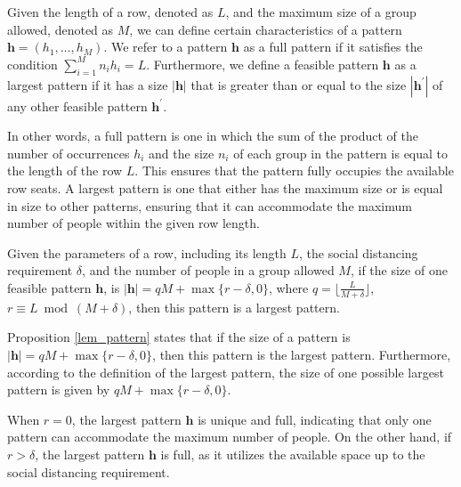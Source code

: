 \begin{definition}
Given the length of a row, denoted as $L$, and the maximum size of a group allowed, denoted as $M$, we can define certain characteristics of a pattern $\bm{h} = (h_1, \ldots, h_M)$.
We refer to a pattern $\bm{h}$ as a full pattern if it satisfies the condition $\sum_{i=1}^{M} n_i h_i = L$. Furthermore, we define a feasible pattern $\bm{h}$ as a largest pattern if it has a size $|\bm{h}|$ that is greater than or equal to the size $|\bm{h}^{\prime}|$ of any other feasible pattern $\bm{h}^{\prime}$.
\end{definition}

In other words, a full pattern is one in which the sum of the product of the number of occurrences $h_i$ and the size $n_i$ of each group in the pattern is equal to the length of the row $L$. This ensures that the pattern fully occupies the available row seats. A largest pattern is one that either has the maximum size or is equal in size to other patterns, ensuring that it can accommodate the maximum number of people within the given row length.


\begin{prop}\label{lem_pattern}
Given the parameters of a row, including its length $L$, the social distancing requirement $\delta$, and the number of people in a group allowed $M$, if the size of one feasible pattern $\bm{h}$, is $|\bm{h}| = qM + \max\{r-\delta, 0\}$, where $q = \lfloor \frac{L}{M + \delta} \rfloor$, $r \equiv L \bmod (M + \delta)$, then this pattern is a largest pattern. 
\end{prop}



Proposition \ref{lem_pattern} states that if the size of a pattern is $|\bm{h}| = qM + \max\{r-\delta, 0\}$, then this pattern is the largest pattern. Furthermore, according to the definition of the largest pattern, the size of one possible largest pattern is given by $qM + \max\{r-\delta, 0\}$.

When $r = 0$, the largest pattern $\bm{h}$ is unique and full, indicating that only one pattern can accommodate the maximum number of people. On the other hand, if $r > \delta$, the largest pattern $\bm{h}$ is full, as it utilizes the available space up to the social distancing requirement.

